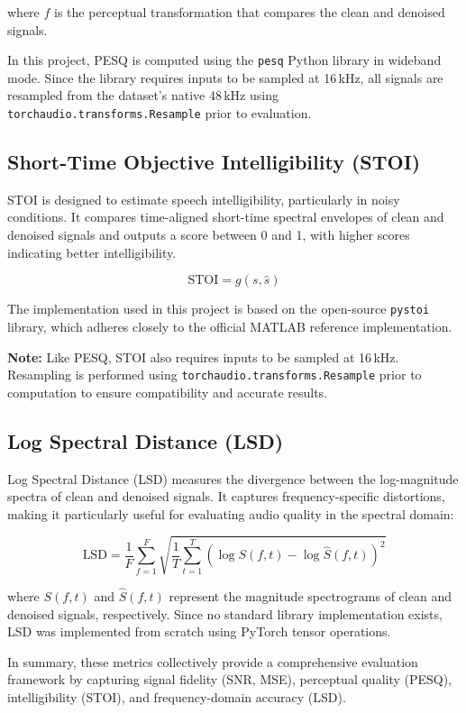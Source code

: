 where $f$ is the perceptual transformation that compares the clean and denoised signals.

In this project, PESQ is computed using the \texttt{pesq} Python library in wideband mode. Since the library requires inputs to be sampled at 16 kHz, all signals are resampled from the dataset's native 48 kHz using \texttt{torchaudio.transforms.Resample} prior to evaluation.

\subsection{Short-Time Objective Intelligibility (STOI)}
\label{subsec:stoi}

STOI is designed to estimate speech intelligibility, particularly in noisy conditions. It compares time-aligned short-time spectral envelopes of clean and denoised signals and outputs a score between 0 and 1, with higher scores indicating better intelligibility.

\begin{equation}
\text{STOI} = g(s, \hat{s})
\end{equation}

The implementation used in this project is based on the open-source \texttt{pystoi} library, which adheres closely to the official MATLAB reference implementation.

\textbf{Note:} Like PESQ, STOI also requires inputs to be sampled at 16 kHz. Resampling is performed using \texttt{torchaudio.transforms.Resample} prior to computation to ensure compatibility and accurate results.

\subsection{Log Spectral Distance (LSD)}
\label{subsec:lsd}

Log Spectral Distance (LSD) measures the divergence between the log-magnitude spectra of clean and denoised signals. It captures frequency-specific distortions, making it particularly useful for evaluating audio quality in the spectral domain:

\begin{equation}
\text{LSD} = \frac{1}{F} \sum_{f=1}^{F} \sqrt{ \frac{1}{T} \sum_{t=1}^{T} \left( \log S(f, t) - \log \hat{S}(f, t) \right)^2 }
\end{equation}

where $S(f, t)$ and $\hat{S}(f, t)$ represent the magnitude spectrograms of clean and denoised signals, respectively. Since no standard library implementation exists, LSD was implemented from scratch using PyTorch tensor operations.

\vspace{1em}
In summary, these metrics collectively provide a comprehensive evaluation framework by capturing signal fidelity (SNR, MSE), perceptual quality (PESQ), intelligibility (STOI), and frequency-domain accuracy (LSD).

